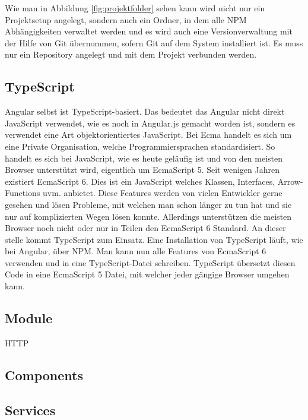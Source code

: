Wie man in Abbildung \ref{fig:projektfolder} sehen kann wird nicht nur ein Projektsetup angelegt, sondern auch ein Ordner, in dem alle \ac{NPM} Abhängigkeiten verwaltet werden und es wird auch eine Versionverwaltung mit der Hilfe von Git übernommen, sofern Git auf dem System installiert ist. Es muss nur ein Repository angelegt und mit dem Projekt verbunden werden.




\subsection{TypeScript}
Angular selbst ist TypeScript-basiert. Das bedeutet das Angular nicht direkt JavaScript verwendet, wie es noch in Angular.js gemacht worden ist, sondern es verwendet eine Art objektorientiertes JavaScript. Bei \ac{Ecma} handelt es sich um eine Private Organisation, welche Programmiersprachen standardisiert. So handelt es sich bei JavaScript, wie es heute geläufig ist und von den meisten Browser unterstützt wird, eigentlich um EcmaScript 5. Seit wenigen Jahren existiert EcmaScript 6. Dies ist ein JavaScript welches Klassen, Interfaces, Arrow-Functions \ac{uvm.} anbietet. Diese Features werden von vielen Entwickler gerne gesehen und lösen Probleme, mit welchen man schon länger zu tun hat und sie nur auf komplizierten Wegen lösen konnte. Allerdings unterstützen die meisten Browser noch nicht oder nur in Teilen den EcmaScript 6 Standard. An dieser stelle kommt TypeScript zum Einsatz. Eine Installation von TypeScript läuft, wie bei Angular, über \ac{NPM}. Man kann nun alle Features von EcmaScript 6 verwenden und in eine TypeScript-Datei schreiben. TypeScript übersetzt diesen Code in eine EcmaScript 5 Datei, mit welcher jeder gängige Browser umgehen kann.



\subsection{Module}
HTTP


\subsection{Components}

\subsection{Services}





